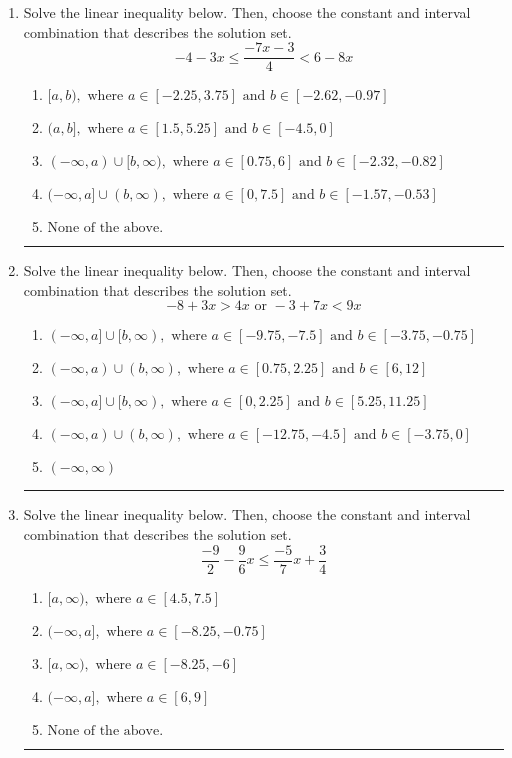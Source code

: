 \documentclass[14pt]{extbook}
\newcommand{\litem}[1]{\item#1\hspace*{-1cm}\rule{\textwidth}{0.4pt}}
\begin{document}
\begin{enumerate}
{\begin{enumerate}[label=\Alph*.]
\end{enumerate} }
\litem{
Solve the linear inequality below. Then, choose the constant and interval combination that describes the solution set.\[ -4 - 3 x \leq \frac{-7 x - 3}{4} < 6 - 8 x \]\begin{enumerate}[label=\Alph*.]
\item \( [a, b), \text{ where } a \in [-2.25, 3.75] \text{ and } b \in [-2.62, -0.97] \)
\item \( (a, b], \text{ where } a \in [1.5, 5.25] \text{ and } b \in [-4.5, 0] \)
\item \( (-\infty, a) \cup [b, \infty), \text{ where } a \in [0.75, 6] \text{ and } b \in [-2.32, -0.82] \)
\item \( (-\infty, a] \cup (b, \infty), \text{ where } a \in [0, 7.5] \text{ and } b \in [-1.57, -0.53] \)
\item \( \text{None of the above.} \)

\end{enumerate} }
\litem{
Solve the linear inequality below. Then, choose the constant and interval combination that describes the solution set.\[ -8 + 3 x > 4 x \text{ or } -3 + 7 x < 9 x \]\begin{enumerate}[label=\Alph*.]
\item \( (-\infty, a] \cup [b, \infty), \text{ where } a \in [-9.75, -7.5] \text{ and } b \in [-3.75, -0.75] \)
\item \( (-\infty, a) \cup (b, \infty), \text{ where } a \in [0.75, 2.25] \text{ and } b \in [6, 12] \)
\item \( (-\infty, a] \cup [b, \infty), \text{ where } a \in [0, 2.25] \text{ and } b \in [5.25, 11.25] \)
\item \( (-\infty, a) \cup (b, \infty), \text{ where } a \in [-12.75, -4.5] \text{ and } b \in [-3.75, 0] \)
\item \( (-\infty, \infty) \)

\end{enumerate} }
\litem{
Solve the linear inequality below. Then, choose the constant and interval combination that describes the solution set.\[ \frac{-9}{2} - \frac{9}{6} x \leq \frac{-5}{7} x + \frac{3}{4} \]\begin{enumerate}[label=\Alph*.]
\item \( [a, \infty), \text{ where } a \in [4.5, 7.5] \)
\item \( (-\infty, a], \text{ where } a \in [-8.25, -0.75] \)
\item \( [a, \infty), \text{ where } a \in [-8.25, -6] \)
\item \( (-\infty, a], \text{ where } a \in [6, 9] \)
\item \( \text{None of the above}. \)


\end{enumerate}}
\end{enumerate}
\end{document}
